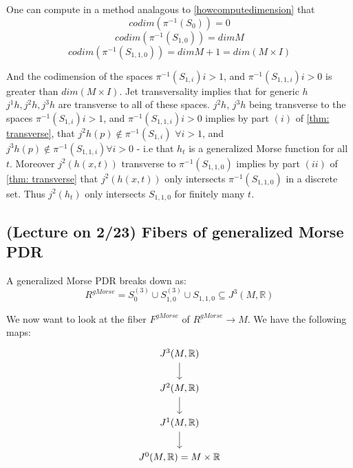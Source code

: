\documentclass{article}
\newtheorem{proposed work}[theorem]{Proposed Work}
\theoremstyle{definition}
\begin{document}
One can compute in a method analagous to \ref{howcomputedimension} that 
\[codim (\pi^{-1}(S_{0}))=0 \]
\[codim (\pi^{-1}(S_{1,0}))=dim M \]
\[codim (\pi^{-1}(S_{1,1,0}))=dim M+1=dim(M \times I) \]
 
And the codimension of the spaces
$\pi^{-1}(S_{1,i}) i>1$, and $ \pi^{-1}(S_{1,1,i}) i>0$ is greater than $dim(M \times I)$.  Jet transversality implies that for generic $h$ $j^1h, j^2h, j^3h$ are transverse to all of these spaces.   $j^2h$, $j^3h$ being transverse to the spaces $\pi^{-1}(S_{1,i}) i>1$, and $ \pi^{-1}(S_{1,1,i}) i>0$  implies by part $(i)$ of \ref{thm: transverse}, that $j^2 h(p) \notin \pi^{-1}(S_{1,i})$ $\forall i>1$, and $j^3 h(p) \notin \pi^{-1}(S_{1,1,i}) \forall i>0$ - i.e that $h_t$ is a generalized Morse function for all $t$.   Moreover $j^2(h(x,t))$ transverse to $\pi^{-1}(S_{1,1,0})$ implies by part $(ii)$ of  \ref{thm: transverse} that $j^2(h(x,t))$ only intersects $\pi^{-1}(S_{1,1,0})$ in a discrete set.  Thus $j^2(h_t)$ only intersects $S_{1,1,0}$ for finitely many $t$.

\subsection{(Lecture on 2/23) Fibers of generalized Morse PDR}
A generalized Morse PDR breaks down as:
$$ R^{gMorse}=S_0^{(3)}\cup S_{1,0}^{(3)}\cup S_{1,1,0}\subseteq J^3(M, \mathbb{R})$$

We now want to look at the fiber $F^{gMorse}$ of $R^{gMorse}\to M$. We have the following maps:
\begin{equation*}
\begin{tikzcd}
J^3(M,\R)\arrow[d]\\
J^2(M,\R)\arrow[d]\\
J^1(M,\R)\arrow[d]\\
J^0(M,\R)=M\times \R
\end{tikzcd}
\end{equation*}
\end{document}
